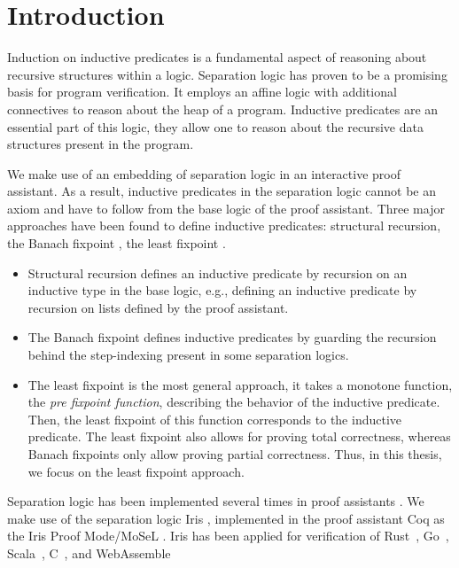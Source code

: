 \documentclass[thesis.tex]{subfiles}
\begin{document}
\chapter{Introduction}\label{ch:introduction}

Induction on inductive predicates is a fundamental aspect of reasoning about recursive structures within a logic. Separation logic \cite{ohearnLocalReasoningPrograms2001,reynoldsSeparationLogicLogic2002b} has proven to be a promising basis for program verification. It employs an affine logic with additional connectives to reason about the heap of a program. Inductive predicates are an essential part of this logic, they allow one to reason about the recursive data structures present in the program.

We make use of an embedding of separation logic in an interactive proof assistant. As a result, inductive predicates in the separation logic cannot be an axiom and have to follow from the base logic of the proof assistant. Three major approaches have been found to define inductive predicates: structural recursion, the Banach fixpoint \cite{jungIrisGroundModular2018}, the least fixpoint \cite{appelProgramLogicsCertified2014}.
\begin{itemize}
  \item Structural recursion defines an inductive predicate by recursion on an inductive type in the base logic, e.g., defining an inductive predicate by recursion on lists defined by the proof assistant.
  \item The Banach fixpoint defines inductive predicates by guarding the recursion behind the step-indexing present in some separation logics.
  \item The least fixpoint is the most general approach, it takes a monotone function, the \emph{pre fixpoint function}, describing the behavior of the inductive predicate. Then, the least fixpoint of this function corresponds to the inductive predicate. The least fixpoint also allows for proving total correctness, whereas Banach fixpoints only allow proving partial correctness. Thus, in this thesis, we focus on the least fixpoint approach.
\end{itemize}

Separation logic has been implemented several times in proof assistants \cite{appelTacticsSeparationLogic,rouvoetIntrinsicallyTypedCompilation2021,chlipalaMostlyautomatedVerificationLowlevel2011,bengtsonCharge2012}. We make use of the separation logic Iris \cite*{jungIrisMonoidsInvariants2015a,jungHigherorderGhostState2016,krebbersEssenceHigherOrderConcurrent2017,jungIrisGroundModular2018}, implemented in the proof assistant Coq as the Iris Proof Mode/MoSeL \cite{krebbersInteractiveProofsHigherorder2017,krebbersMoSeLGeneralExtensible2018}. Iris has been applied for verification of Rust~\cite{jungRustBeltSecuringFoundations2017,dangRustBeltMeetsRelaxed2019,matsushitaRustHornBeltSemanticFoundation2022}, Go~\cite{chajedVerifyingConcurrentCrashsafe2019}, Scala~\cite{giarrussoScalaStepbystepSoundness2020}, C~\cite{sammlerRefinedCAutomatingFoundational2021}, and WebAssemble~\cite{raoIrisWasmRobustModular2023}
\end{document}
